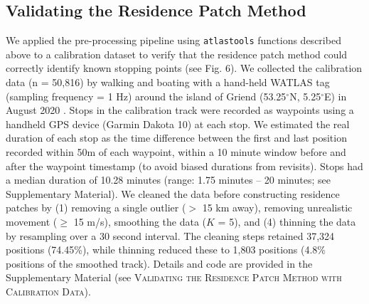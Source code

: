 \documentclass[10pt,paper=a4,headings=standardclasses
]{scrartcl}
\begin{document}
\subsection{Validating the Residence Patch Method}

We applied the pre-processing pipeline using \texttt{atlastools} functions described above to a calibration dataset to verify that the residence patch method could correctly identify known stopping points (see Fig. 6).
We collected the calibration data (n = 50,816) by walking and boating with a hand-held WATLAS tag (sampling frequency = 1 Hz) around the island of Griend (53.25$^{\circ}$N, 5.25$^{\circ}$E) in August 2020 \citep[][Bijleveld et al. \textit{in prep.}]{beardsworth2021}.
Stops in the calibration track were recorded as waypoints using a handheld GPS device (Garmin Dakota 10) at each stop.
We estimated the real duration of each stop as the time difference between the first and last position recorded within 50m of each waypoint, within a 10 minute window before and after the waypoint timestamp (to avoid biased durations from revisits).
Stops had a median duration of 10.28 minutes (range: 1.75 minutes -- 20 minutes; see Supplementary Material).
We cleaned the data before constructing residence patches by (1) removing a single outlier ($>$ 15 km away), removing unrealistic movement ($\geq$ 15 m/s), smoothing the data ($K$ = 5), and (4) thinning the data by resampling over a 30 second interval.
The cleaning steps retained 37,324 positions (74.45\%), while thinning reduced these to 1,803 positions (4.8\% positions of the smoothed track).
Details and code are provided in the Supplementary Material (see \textsc{Validating the Residence Patch Method with Calibration Data}).

\end{document}
